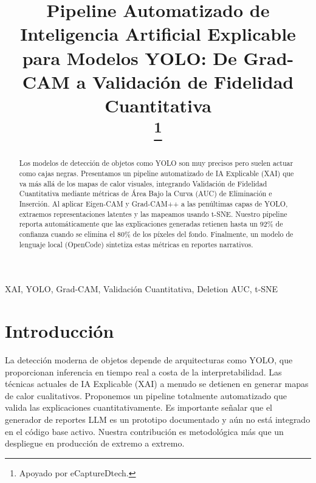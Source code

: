\documentclass[conference]{IEEEtran}
\begin{document}
\title{Pipeline Automatizado de Inteligencia Artificial Explicable para Modelos YOLO: De Grad-CAM a Validación de Fidelidad Cuantitativa\\
\thanks{Apoyado por eCaptureDtech.}
}

\author{
}
\maketitle

\begin{abstract}
Los modelos de detección de objetos como YOLO son muy precisos pero suelen actuar como cajas negras. Presentamos un pipeline automatizado de IA Explicable (XAI) que va más allá de los mapas de calor visuales, integrando Validación de Fidelidad Cuantitativa mediante métricas de Área Bajo la Curva (AUC) de Eliminación e Inserción. Al aplicar Eigen-CAM y Grad-CAM++ a las penúltimas capas de YOLO, extraemos representaciones latentes y las mapeamos usando t-SNE. Nuestro pipeline reporta automáticamente que las explicaciones generadas retienen hasta un 92\% de confianza cuando se elimina el 80\% de los píxeles del fondo. Finalmente, un modelo de lenguaje local (OpenCode) sintetiza estas métricas en reportes narrativos.
\end{abstract}

\begin{IEEEkeywords}
XAI, YOLO, Grad-CAM, Validación Cuantitativa, Deletion AUC, t-SNE
\end{IEEEkeywords}

\section{Introducción}
La detección moderna de objetos depende de arquitecturas como YOLO, que proporcionan inferencia en tiempo real a costa de la interpretabilidad. Las técnicas actuales de IA Explicable (XAI) a menudo se detienen en generar mapas de calor cualitativos. Proponemos un pipeline totalmente automatizado que valida las explicaciones cuantitativamente. Es importante señalar que el generador de reportes LLM es un prototipo documentado y aún no está integrado en el código base activo. Nuestra contribución es metodológica más que un despliegue en producción de extremo a extremo.
\end{document}
